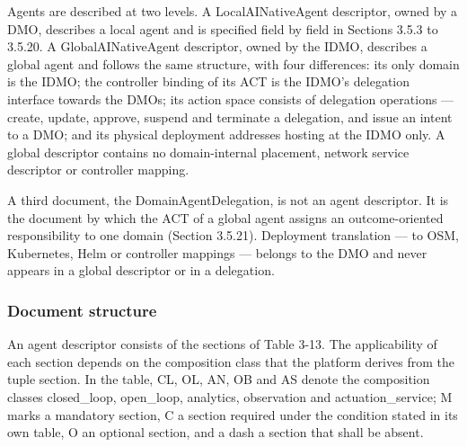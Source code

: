 Agents are described at two levels. A LocalAINativeAgent descriptor,
owned by a DMO, describes a local agent and is specified field by field
in Sections 3.5.3 to 3.5.20. A GlobalAINativeAgent descriptor, owned by
the IDMO, describes a global agent and follows the same structure, with
four differences: its only domain is the IDMO; the controller binding of
its ACT is the IDMO's delegation interface towards the DMOs; its action
space consists of delegation operations --- create, update, approve,
suspend and terminate a delegation, and issue an intent to a DMO; and
its physical deployment addresses hosting at the IDMO only. A global
descriptor contains no domain-internal placement, network service
descriptor or controller mapping.

A third document, the DomainAgentDelegation, is not an agent descriptor.
It is the document by which the ACT of a global agent assigns an
outcome-oriented responsibility to one domain (Section 3.5.21).
Deployment translation --- to OSM, Kubernetes, Helm or controller
mappings --- belongs to the DMO and never appears in a global descriptor
or in a delegation.

\hypertarget{document-structure}{%
\subsubsection{Document structure}\label{document-structure}}

An agent descriptor consists of the sections of Table 3-13. The
applicability of each section depends on the composition class that the
platform derives from the tuple section. In the table, CL, OL, AN, OB
and AS denote the composition classes closed\_\allowbreak{}loop,
open\_\allowbreak{}loop, analytics, observation and
actuation\_\allowbreak{}service; M marks a mandatory section, C a
section required under the condition stated in its own table, O an
optional section, and a dash a section that shall be absent.

